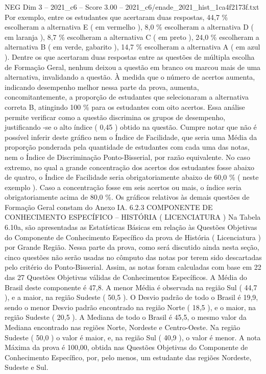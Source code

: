 \begin{textsample}{NEG Dim 3 – 2021\_c6 – Score 3.00 – 2021\_c6/enade\_2021\_hist\_1ca4f2173f.txt}
Por exemplo, entre os estudantes que acertaram duas respostas, 44,7 \% escolheram a alternativa E ( em vermelho ), 8,0 \% escolheram a alternativa D ( em laranja ), 8,7 \% escolheram a alternativa C ( em preto ), 24,0 \% escolheram a alternativa B ( em verde, gabarito ), 14,7 \% escolheram a alternativa A ( em azul ).
Dentre os que acertaram duas respostas entre as questões de múltipla escolha de Formação Geral, nenhum deixou a questão em branco ou marcou mais de uma alternativa, invalidando a questão.
À medida que o número de acertos aumenta, indicando desempenho melhor nessa parte da prova, aumenta, concomitantemente, a proporção de estudantes que selecionaram a alternativa correta B, atingindo 100 \% para os estudantes com oito acertos.
Essa análise permite verificar como a questão discrimina os grupos de desempenho, justificando -se o alto índice ( 0,45 ) obtido na questão.
Cumpre notar que não é possível inferir deste gráfico nem o Índice de Facilidade, que seria uma Média da proporção ponderada pela quantidade de estudantes com cada uma das notas, nem o Índice de Discriminação Ponto-Bisserial, por razão equivalente.
No caso extremo, no qual a grande concentração dos acertos dos estudantes fosse abaixo de quatro, o Índice de Facilidade seria obrigatoriamente abaixo de 60,0 \% ( neste exemplo ).
Caso a concentração fosse em seis acertos ou mais, o índice seria obrigatoriamente acima de 80,0 \%.
Os gráficos relativos às demais questões de Formação Geral constam do Anexo IA. 6.2.3 COMPONENTE DE CONHECIMENTO ESPECÍFICO – HISTÓRIA ( LICENCIATURA ) Na Tabela 6.10a, são apresentadas as Estatísticas Básicas em relação às Questões Objetivas do Componente de Conhecimento Específico da prova de História ( Licenciatura ) por Grande Região.
Nessa parte da prova, como será discutido ainda nesta seção, cinco questões não serão usadas no cômputo das notas por terem sido descartadas pelo critério do Ponto-Bisserial.
Assim, as notas foram calculadas com base em 22 das 27 Questões Objetivas válidas de Conhecimentos Específicos.
A Média do Brasil deste componente é 47,8.
A menor Média é observada na região Sul ( 44,7 ), e a maior, na região Sudeste ( 50,5 ).
O Desvio padrão de todo o Brasil é 19,9, sendo o menor Desvio padrão encontrado na região Norte ( 18,5 ), e o maior, na região Sudeste ( 20,5 ).
A Mediana de todo o Brasil é 45,5, o mesmo valor da Mediana encontrado nas regiões Norte, Nordeste e Centro-Oeste.
Na região Sudeste ( 50,0 ) o valor é maior, e, na região Sul ( 40,9 ), o valor é menor.
A nota Máxima da prova é 100,00, obtida nas Questões Objetivas do Componente de Conhecimento Específico, por, pelo menos, um estudante das regiões Nordeste, Sudeste e Sul.

\end{textsample}
